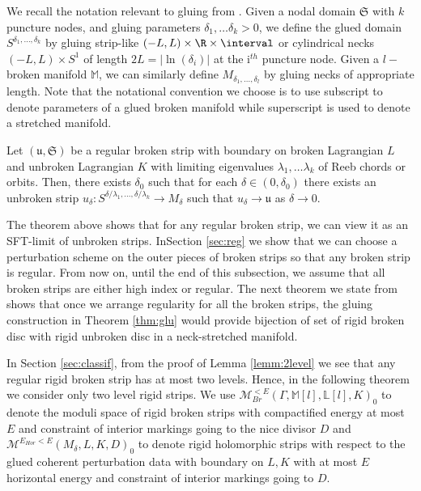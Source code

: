 We recall the notation relevant to gluing from \cite{palmerwoodwardsurg}.  Given a nodal domain $\mathfrak{S}$ with $k$ puncture nodes, and gluing parameters $\delta_1,\dots \delta_k > 0$, we define the glued domain $S^{\delta_1,\dots,\delta_k}$ by gluing strip-like $(-L,L) \times \R \times \interval$ or cylindrical necks $(-L,L) \times S^1$ of length $2L =|\ln (\delta_i)|$ at the i$^{th}$ puncture node. Given a $l-$broken manifold $\mathbb M$, we can similarly define $M_{\delta_1,\dots,\delta_l}$ by gluing necks of appropriate length. Note that the notational convention we choose is to use subscript to denote parameters of a glued broken manifold while superscript is used to denote a stretched manifold.

\begin{Theorem}\label{thm:glu} 
Let $(\mathfrak{u,S})$ be a regular broken strip with boundary on broken Lagrangian $L$ and unbroken Lagrangian $K$ with limiting eigenvalues $\lambda_1,\dots\lambda_k$ of Reeb chords or orbits. Then, there exists  $\delta_0$ such that for each $\delta \in (0,\delta_0)$ there exists an unbroken strip $u_\delta: S^{\delta/\lambda_1,\dots,\delta/\lambda_k} \to M_\delta$ such that $u_\delta \to \mathfrak{u}$ as $\delta \to 0$.
\end{Theorem}



The theorem above shows that for any regular broken strip, we can view it as an SFT-limit of unbroken strips. InSection \ref{sec:reg} we show that we can choose a perturbation scheme on the outer pieces of broken strips so that any broken strip is regular. From now on, until the end of this subsection, we assume that all broken strips are either high index or regular.  The next theorem we state from \cite{palmerwoodwardsurg} shows that once we arrange regularity for all the broken strips, the gluing construction in Theorem \ref{thm:glu} would provide bijection of set of rigid broken disc with rigid unbroken disc in a neck-stretched manifold. 
 
In Section \ref{sec:classif}, from the proof of Lemma \ref{lemm:2level} we see that any regular rigid broken strip has at most two levels. Hence, in the following theorem we consider only two level rigid strips. We use $\mathcal{M}^{<E}_{Br}(\Gamma,\mathbb{M}[l],\mathbb{L}[l],K)_0$ to denote the moduli space of rigid broken strips with compactified energy at most $E$ and constraint of interior markings going to the nice divisor $D$  and $\mathcal M ^{E_{Hor}< E}(M_{\delta},L,K,D)_0$ to denote rigid holomorphic strips with respect to the glued coherent perturbation data with boundary on $L,K$ with  at most $E$ horizontal energy and constraint of interior markings going to $D$. 

